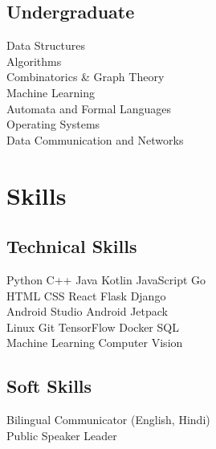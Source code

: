 \documentclass[]{deedy-resume-openfont}
\begin{document}
\begin{minipage}[t]{0.30\textwidth}
\subsection{Undergraduate}
Data Structures \\
Algorithms \\
Combinatorics \& Graph Theory \\
Machine Learning \\
Automata and Formal Languages \\
Operating Systems \\
Data Communication and Networks \\

\section{Skills}
\subsection{Technical Skills}
Python \textbullet{} C++ \textbullet{} Java \textbullet{} Kotlin \textbullet{} JavaScript \textbullet{} Go \\
\vspace{2mm}
HTML \textbullet{} CSS \textbullet{} React \textbullet{} Flask \textbullet{} Django \\
\vspace{2mm}
Android Studio \textbullet{} Android Jetpack \\
\vspace{2mm}
Linux \textbullet{} Git \textbullet{} TensorFlow \textbullet{} Docker \textbullet{} SQL \\
\vspace{2mm}
Machine Learning \textbullet{} Computer Vision
\sectionsep

\subsection{Soft Skills}
Bilingual Communicator (English, Hindi) \\
Public Speaker \textbullet{} Leader

\end{minipage}
\hfill
\end{document}
